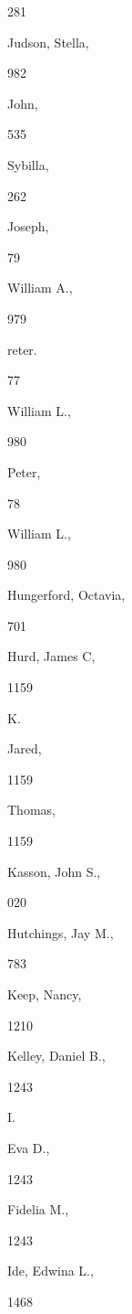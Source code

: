 {{{{281 


Judson, Stella, 


982 


John, 


535 


Sybilla, 


262 


Joseph, 


79 


William A., 


979 


reter. 


77 


William L., 


980 


Peter, 


78 


William L., 


980 


Hungerford, Octavia, 


701 






Hurd, James C, 


1159 


K. 




Jared, 


1159 






Thomas, 


1159 


Kasson, John S., 


020 


Hutchings, Jay M., 


783 


Keep, Nancy, 


1210 






Kelley, Daniel B., 


1243 


I. 




Eva D., 


1243 






Fidelia M., 


1243 


Ide, Edwina L., 


1468 


}}}}
